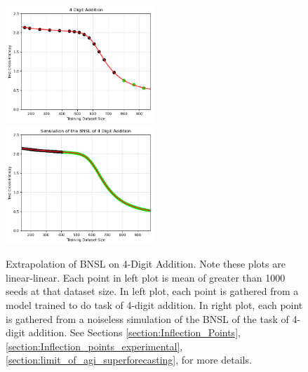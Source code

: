 \documentclass{article} %
\begin{document}
\vspace{-2.58mm}

\begin{figure}[htbp]
    \centering


\includegraphics[width=0.496\textwidth]{figures/arithmetic/4_digit_addition__dataset_size.png}
\includegraphics[width=0.496\textwidth]{figures/arithmetic/4_digit_addition__dataset_size__very_first_version__simulation_limit.png}
\vspace{-7.95mm}
    \caption{
    Extrapolation of BNSL on 4-Digit Addition. Note these plots are linear-linear. Each point in left plot is mean of greater than 1000 seeds at that dataset size. In left plot, each point is gathered from a model trained to do task of 4-digit addition. In right plot, each point is gathered from a noiseless simulation of the BNSL of the task of 4-digit addition. See Sections \ref{section:Inflection_Points}, \ref{section:Inflection_points_experimental}, \ref{section:limit_of_agi_superforecasting}, for more details.
    }
    \label{fig:arithmetic}
\end{figure}
\vspace{-2.46mm}
\FloatBarrier

\end{document}
